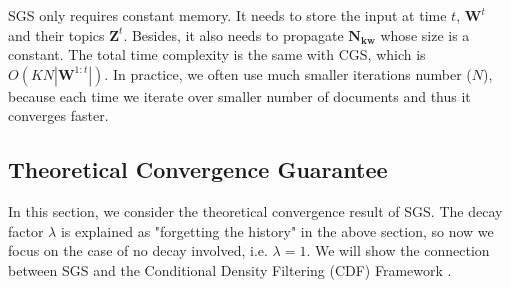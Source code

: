 \documentclass{article}
\begin{document}
%

SGS only requires constant memory. It needs to store the input at time $t$, $\bm{W}^t$ and their topics $\bm{Z}^t$. Besides, it also needs to propagate $\bm{N_{kw}}$ whose size is a constant. The total time complexity is the same with CGS, which is $O(KN|\bm{W}^{1:t}|)$. In practice, we often use much smaller iterations number ($N$), because each time we iterate over smaller number of documents and thus it converges faster.


\subsection{Theoretical Convergence Guarantee}
In this section, we consider the theoretical convergence result of SGS. The decay factor $\lambda$ is explained as "forgetting the history" in the above section, so now we focus on the case of no decay involved, i.e. $\lambda=1$. We will show the connection between SGS and the Conditional Density Filtering (CDF) Framework \cite{guhaniyogi2014bayesian}.
\end{document}

